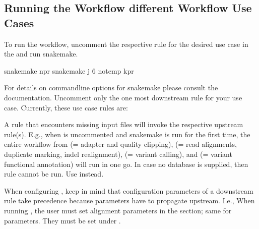 \documentclass[letterpaper,10pt,english]{sphinxhowto}
\begin{document}
\subsection{Running the Workflow \sphinxhyphen{} different Workflow Use Cases}
\label{\detokenize{index:running-the-workflow-different-workflow-use-cases}}
To run the workflow, un\sphinxhyphen{}comment the respective rule for the desired use case in the  and run snakemake.

\begin{sphinxVerbatim}[commandchars=\\\{\}]
\PYGZdl{} snakemake \textendash{}npr
\PYGZdl{} snakemake \textendash{}j 6 \PYGZhy{}\PYGZhy{}notemp \PYGZhy{}kpr
\end{sphinxVerbatim}

For details on commandline options for snakemake please consult the  documentation. Un\sphinxhyphen{}comment only the one most downstream rule for your use case. Currently, these use case rules are:

\begin{sphinxVerbatim}[commandchars=\\\{\}]
\end{sphinxVerbatim}

A rule that encounters missing input files will invoke the respective upstream rule(s). E.g., when  is uncommented and snakemake is run for the first time, the entire workflow from  (= adapter and quality clipping),  (= read alignments, duplicate marking, indel realignment),  (= variant calling), and  (= variant functional annotation) will run in one go.
In case no  database is supplied, then rule  cannot be run. Use  instead.

When configuring , keep in mind that configuration parameters of a downstream rule take precedence because parameters have to propagate upstream. I.e., When running , the user must set alignment parameters in the  section; same for  parameters. They must be set under .
\end{document}
